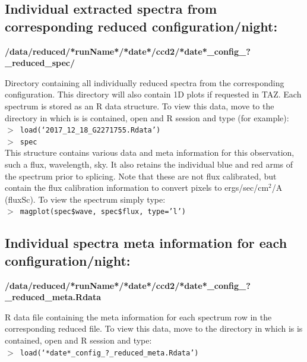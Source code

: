 \documentclass[12pt]{article}
\begin{document}
 \subsection{Individual extracted spectra from corresponding reduced configuration/night:}
 
   \textbf{/data/reduced/*runName*/*date*/ccd2/*date*\_config\_?\_reduced\_spec/}
   
  Directory containing all individually reduced spectra from the corresponding  configuration. This directory will also contain 1D plots if requested in TAZ. Each spectrum is stored as an R data structure. To view this data, move to the directory in which is is contained, open and R session and type (for example):\\
  
\hspace{10mm}  \texttt{$>$ load(`2017\_12\_18\_G2271755.Rdata')}\\

\hspace{10mm}  \texttt{$>$ spec}\\  

This structure contains various data and meta information for this observation, such a flux, wavelength, sky. It also retains the individual blue and red arms of the spectrum prior to splicing. Note that these are not flux calibrated, but contain the flux calibration information to convert pixels to ergs/sec/cm$^2$/A (fluxSc). To view the spectrum simply type:\\

 \hspace{10mm}  \texttt{$>$ magplot(spec\$wave, spec\$flux, type='l')}\\  



 \subsection{Individual spectra meta information for each configuration/night:} 
 
  \textbf{/data/reduced/*runName*/*date*/ccd2/*date*\_config\_?\_reduced\_meta.Rdata} 
  
  R data file containing the meta information for each spectrum row in the corresponding reduced file. To view this data, move to the directory in which is is contained, open and R session and type:\\
 

\hspace{10mm}  \texttt{$>$ load(`*date*\_config\_?\_reduced\_meta.Rdata')}\\
\end{document}
